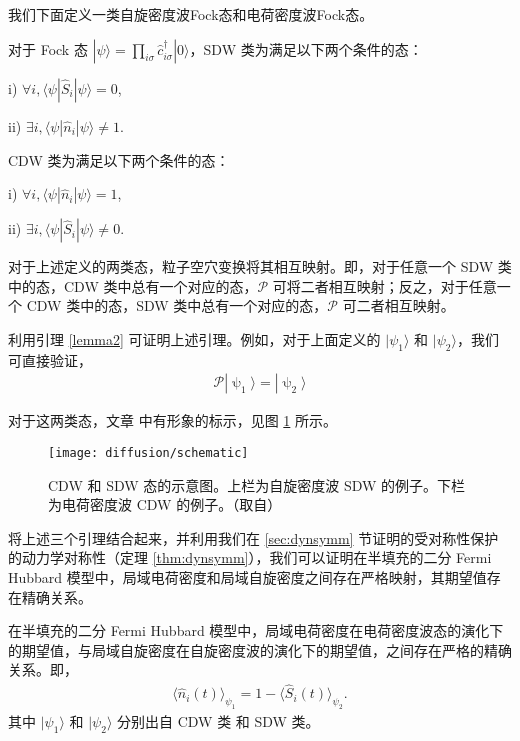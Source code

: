 我们下面定义一类自旋密度波Fock态和电荷密度波Fock态。
\begin{definition}\label{def:state12}
对于 Fock 态 $|\psi\rangle = \prod_{i\sigma}\hat{c}_{i\sigma}^{\dagger}|0\rangle$，SDW 类为满足以下两个条件的态：

i) $\forall i, \langle\psi|\hat{S}_i|\psi\rangle = 0$, 

ii) $\exists i, \langle\psi|\hat{n}_i|\psi\rangle \neq 1$. 

CDW 类为满足以下两个条件的态：

i) $\forall i, \langle\psi|\hat{n}_i|\psi\rangle = 1$, 

ii) $\exists i, \langle\psi|\hat{S}_i|\psi\rangle \neq 0$. 
\end{definition}

\begin{lemma}
对于上述定义的两类态，粒子空穴变换将其相互映射。即，对于任意一个 SDW 类中的态，CDW 类中总有一个对应的态，$\mathcal{P}$ 可将二者相互映射；反之，对于任意一个 CDW 类中的态，SDW 类中总有一个对应的态，$\mathcal{P}$ 可二者相互映射。
\end{lemma}
利用引理 \ref{lemma2} 可证明上述引理。例如，对于上面定义的 $|\psi_1\rangle$ 和 $|\psi_2\rangle$，我们可直接验证，
\begin{align}
\mathcal{P}|\uppsi_1\rangle = |\uppsi_2\rangle
\end{align}

对于这两类态，文章 中有形象的标示，见图 \ref{fig:diffusion:schematic} 所示。
\begin{figure}[!htb]
\centering
\texttt{[image: diffusion/schematic]}
\caption{CDW 和 SDW 态的示意图。上栏为自旋密度波 SDW 的例子。下栏为电荷密度波 CDW 的例子。（取自）}
\label{fig:diffusion:schematic}
\end{figure}

将上述三个引理结合起来，并利用我们在 \ref{sec:dynsymm} 节证明的受对称性保护的动力学对称性（定理 \ref{thm:dynsymm}），我们可以证明在半填充的二分 Fermi Hubbard 模型中，局域电荷密度和局域自旋密度之间存在严格映射，其期望值存在精确关系。

\begin{theorem}\label{thm:diffusion}
在半填充的二分 Fermi Hubbard 模型中，局域电荷密度在电荷密度波态的演化下的期望值，与局域自旋密度在自旋密度波的演化下的期望值，之间存在严格的精确关系。即，
\begin{align}
\langle \hat{n}_i(t)\rangle_{\psi_1} = 1 - \langle \hat{S}_i(t)\rangle_{\psi_2}.
\end{align}
其中 $|\psi_1\rangle$ 和 $|\psi_2\rangle$ 分别出自 CDW 类 和 SDW 类。
\end{theorem}

